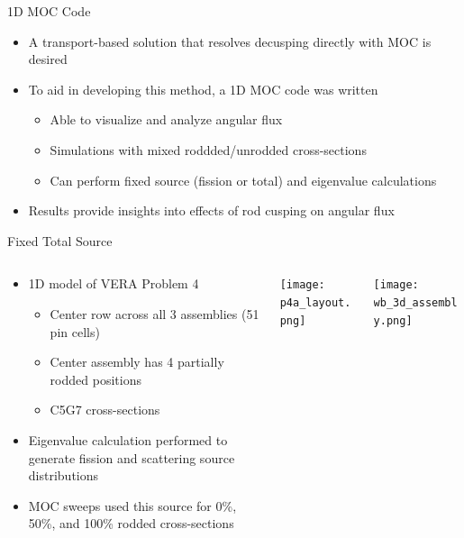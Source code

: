 \begin{frame}[t]{1D MOC Code}
    
    \begin{itemize}
      \item A transport-based solution that resolves decusping directly with 
      MOC is desired
      \item To aid in developing this method, a 1D MOC code was written
      \begin{itemize}
        \item Able to visualize and analyze angular flux
        \item Simulations with mixed roddded/unrodded cross-sections
        \item Can perform fixed source (fission or total) and eigenvalue 
        calculations
      \end{itemize}
      \item Results provide insights into effects of rod cusping on angular flux
    \end{itemize}
    
\end{frame}


\begin{frame}[t]{Fixed Total Source}

\begin{columns}
    \begin{column}{0.5\textwidth}
\begin{itemize}
  \item 1D model of VERA Problem 4
  \begin{itemize}
    \item Center row across all 3 assemblies (51 pin cells)
    \item Center assembly has 4 partially rodded positions
    \item C5G7 cross-sections \cite{EELewisC5G72003,EELewisC5G7extended2005}
  \end{itemize}
  \item Eigenvalue calculation performed to generate fission and scattering 
  source 
  distributions
  \item MOC sweeps used this source for 0\%, 50\%, and 100\% rodded 
  cross-sections
\end{itemize}
\end{column}
\begin{column}{0.28\textwidth}
\texttt{[image: p4a\_layout.png]}
\end{column}
\begin{column}{0.22\textwidth}
\texttt{[image: wb\_3d\_assembly.png]}
\end{column}
\end{columns}

\end{frame}

